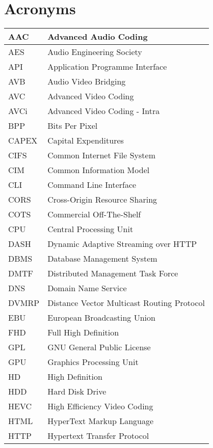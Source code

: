 \cleardoublepage
{}
\chapter*{Acronyms}


\begin{longtable}{p{} p{}}
\hline
AAC & Advanced Audio Coding  \\
\hline
AES & Audio Engineering Society  \\
\hline
API & Application Programme Interface  \\
\hline
AVB & Audio Video Bridging \\
\hline
AVC & Advanced Video Coding \\
\hline
AVCi & Advanced Video Coding - Intra \\
\hline
BPP & Bits Per Pixel \\
\hline
CAPEX & Capital Expenditures \\
\hline
CIFS & Common Internet File System \\
\hline
CIM & Common Information Model \\
\hline
CLI & Command Line Interface \\
\hline
CORS & Cross-Origin Resource Sharing \\
\hline
COTS & Commercial Off-The-Shelf \\
\hline
CPU & Central Processing Unit \\
\hline
DASH & Dynamic Adaptive Streaming over HTTP \\
\hline
DBMS & Database Management System \\
\hline
DMTF & Distributed Management Task Force \\
\hline
DNS & Domain Name Service  \\
\hline
DVMRP & Distance Vector Multicast Routing Protocol \\
\hline
EBU & European Broadcasting Union \\
\hline
FHD & Full High Definition \\
\hline
GPL & GNU General Public License \\
\hline
GPU & Graphics Processing Unit \\
\hline
HD & High Definition \\
\hline
HDD & Hard Disk Drive \\
\hline
HEVC & High Efficiency Video Coding \\
\hline
HTML & HyperText Markup Language \\
\hline
HTTP & Hypertext Transfer Protocol \\

\end{longtable}
